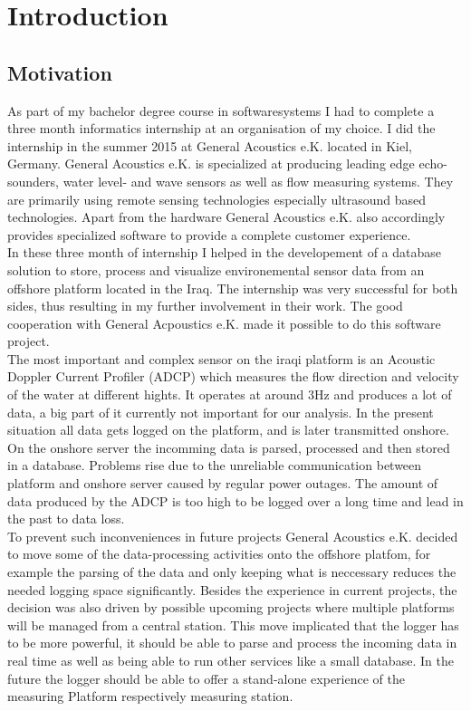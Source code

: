 \chapter{Introduction}

\section{Motivation}
As part of my bachelor degree course in softwaresystems I had to complete a three month informatics internship at an organisation of my choice. I did the internship in the summer 2015 at General Acoustics e.K. located in Kiel, Germany. General Acoustics e.K. is specialized at producing leading edge echo-sounders, water level- and wave sensors as well as flow measuring systems. They are primarily using remote sensing technologies especially ultrasound based technologies. Apart from the hardware General Acoustics e.K. also accordingly provides specialized software to provide a complete customer experience.\\
In these three month of internship I helped in the developement of a database solution to store, process and visualize environemental sensor data from an offshore platform located in the Iraq. The internship was very successful for both sides, thus resulting in my further involvement in their work. The good cooperation with General Acpoustics e.K. made it possible to do this software project.\\\newline%
The most important and complex sensor on the iraqi platform is an Acoustic Doppler Current Profiler (ADCP) which measures the flow direction and velocity of the water at different hights. It operates at around 3Hz and produces a lot of data, a big part of it currently not important for our analysis. In the present situation all data gets logged on the platform, and is later transmitted onshore. On the onshore server the incomming data is parsed, processed and then stored in a database. Problems rise due to the unreliable communication between platform and onshore server caused by regular power outages. The amount of data produced by the ADCP is too high to be logged over a long time and lead in the past to data loss.\\\newline
To prevent such inconveniences in future projects General Acoustics e.K. decided to move some of the data-processing activities onto the offshore platfom, for example the parsing of the data and only keeping what is neccessary reduces the needed logging space significantly. Besides the experience in current projects, the decision was also driven by possible upcoming projects where multiple platforms will be managed from a central station. This move implicated that the logger has to be more powerful, it should be able to parse and process the incoming data in real time as well as being able to run other services like a small database. In the future the logger should be able to offer a stand-alone experience of the measuring Platform respectively measuring station.\\\newline

